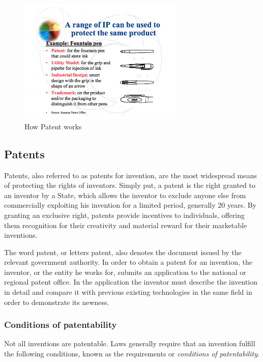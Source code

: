 \documentclass[a4paper,11pt]{article}
\begin{document}
\begin{figure}
\centering
\includegraphics[width=0.7\textwidth]{patent_office}
\caption{How Patent works\cite{patentworkjapan}}
\end{figure}

\subsection{Patents}
Patents, also referred to as patents for invention, are the most widespread
means
of protecting the rights of inventors. Simply put, a patent is the right
granted to
an inventor by a State, which
allows the inventor to exclude anyone else from commercially exploiting his
invention for a limited period, generally 20 years. By granting an exclusive
right,
patents provide incentives to individuals, offering them recognition for their
creativity and material reward for their marketable inventions. 

The word patent, or letters patent, also denotes the document issued by the
relevant
government authority. In order to obtain a patent for an invention, the
inventor,
or the entity he works for, submits an application to the national or regional
patent
office. In the application the inventor must describe the invention in detail
and
compare it with previous existing technologies in the same field in order to
demonstrate its newness. 

\subsubsection{Conditions of patentability}
Not all inventions are patentable. Laws generally require that an invention
fulfill the
following conditions, known as the requirements or \emph{conditions of
patentability}.
\end{document}
